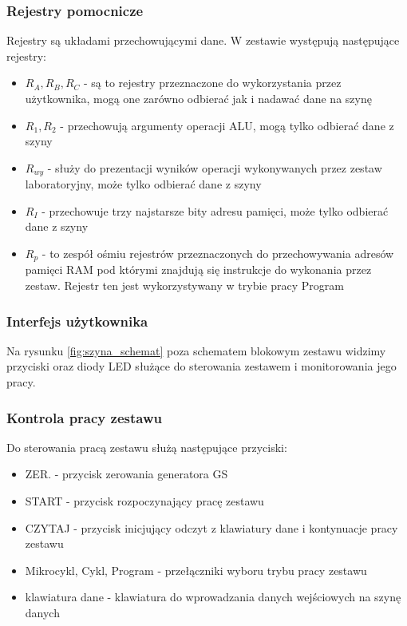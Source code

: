 \documentclass[../main.tex]{subfiles}
\begin{document}
        \subsubsection*{Rejestry pomocnicze}
        Rejestry są układami przechowującymi dane. W zestawie występują następujące rejestry:
        \begin{itemize}
            \item $R_A, R_B, R_C$ - są to rejestry przeznaczone do wykorzystania przez użytkownika, 
            mogą one zarówno odbierać jak i nadawać dane na szynę
            \item $R_1, R_2$ - przechowują argumenty operacji ALU, mogą tylko odbierać dane z szyny
            \item $R_{wy}$ - służy do prezentacji wyników operacji wykonywanych przez zestaw laboratoryjny, może tylko odbierać dane z szyny
            \item $R_I$ - przechowuje trzy najstarsze bity adresu pamięci, może tylko odbierać dane z szyny
            \item $R_p$ - to zespół ośmiu rejestrów przeznaczonych do przechowywania adresów pamięci RAM pod którymi znajdują
            się instrukcje do wykonania przez zestaw. Rejestr ten jest wykorzystywany w trybie pracy Program
        \end{itemize}

    \subsubsection{Interfejs użytkownika}

    Na rysunku \ref{fig:szyna_schemat} poza schematem blokowym zestawu widzimy przyciski oraz diody LED służące do sterowania zestawem i 
    monitorowania jego pracy. 

    \subsubsection*{Kontrola pracy zestawu}
    Do sterowania pracą zestawu służą następujące przyciski:
    \begin{itemize}
        \item ZER. - przycisk zerowania generatora GS
        \item START - przycisk rozpoczynający pracę zestawu
        \item CZYTAJ - przycisk inicjujący odczyt z klawiatury dane i kontynuacje pracy zestawu
        \item Mikrocykl, Cykl, Program - przełączniki wyboru trybu pracy zestawu
        \item klawiatura dane - klawiatura do wprowadzania danych wejściowych na szynę danych
    \end{itemize}
    
\end{document}
